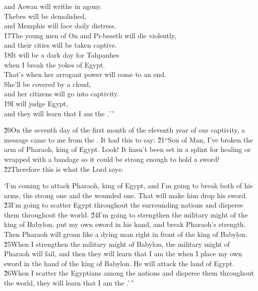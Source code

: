 \begin{poetry}
\poemll    and Aswan will writhe in agony. \\
\poeml Thebes will be demolished, \\
\poemll    and Memphis will face daily distress. \\
\poeml \v{17}The young men of On and Pi-beseth will die violently, \\
\poemll    and their cities will be taken captive. \\
\poeml \v{18}It will be a dark day for Tahpanhes \\
\poemll    when I break the yokes of Egypt. \\
\poeml That's when her arrogant power will come to an end. \\
\poemll    She'll be covered by a cloud, \\
\poemlll       and her citizens will go into captivity. \\
\poeml \v{19}I will judge Egypt, \\
\poemll    and they will learn that I am the .'\,''
\end{poetry}

\v{20}On the seventh day of the first month of the eleventh year of our captivity, a message came to me from the . It had this to say: \v{21}``Son of Man, I've broken the arm of Pharaoh, king of Egypt. Look! It hasn't been set in a splint for healing or wrapped with a bandage so it could be strong enough to hold a sword! \v{22}Therefore this is what the Lord  says:

`I'm coming to attack Pharaoh, king of Egypt, and I'm going to break both of his arms, the strong one and the wounded one. That will make him drop his sword. \v{23}I'm going to scatter Egypt throughout the surrounding nations and disperse them throughout the world. \v{24}I'm going to strengthen the military might of the king of Babylon, put my own sword in his hand, and break Pharaoh's strength. Then Pharaoh will groan like a dying man right in front of the king of Babylon. \v{25}When I strengthen the military might of Babylon, the military might of Pharaoh will fail, and then they will learn that I am the  when I place my own sword in the hand of the king of Babylon. He will attack the land of Egypt. \v{26}When I scatter the Egyptians among the nations and disperse them throughout the world, they will learn that I am the .'\,''

